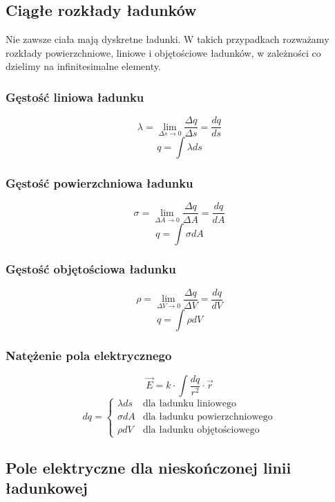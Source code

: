 \documentclass{../notatki}
\begin{document}
\subsection{Ciągłe rozkłady ładunków}

Nie zawsze ciała mają dyskretne ładunki. W takich przypadkach rozważamy rozkłady
powierzchniowe, liniowe i objętościowe ładunków, w zależności co dzielimy
na infinitesimalne elementy.

\subsubsection{Gęstość liniowa ładunku}

$$
\lambda = \lim_{\Delta s \rightarrow 0} \frac{\Delta q}{\Delta s} =
\frac{dq}{ds}
$$
$$
q = \int \lambda ds
$$

\subsubsection{Gęstość powierzchniowa ładunku}

$$
\sigma = \lim_{\Delta A \rightarrow 0} \frac{\Delta q}{\Delta A} =
\frac{dq}{dA}
$$
$$
q = \int \sigma dA
$$

\subsubsection{Gęstość objętościowa ładunku}

$$
\rho = \lim_{\Delta V \rightarrow 0} \frac{\Delta q}{\Delta V} =
\frac{dq}{dV}
$$
$$
q = \int \rho dV
$$

\subsubsection{Natężenie pola elektrycznego}

$$
\vec{E} = k \cdot \int \frac{dq}{r^2} \cdot \vec{r}
$$
$$
dq =
\begin{cases}
  \lambda ds & \text{dla ładunku liniowego} \\
  \sigma dA & \text{dla ładunku powierzchniowego} \\
  \rho dV & \text{dla ładunku objętościowego}
\end{cases}
$$

\subsection{Pole elektryczne dla nieskończonej linii ładunkowej}
\end{document}
